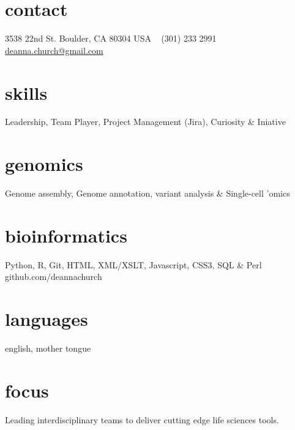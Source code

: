 \documentclass[]{dmc-cv} %
\begin{document}


\begin{aside} %
\section{contact}
3538 22nd St.
Boulder, CA 80304
USA
~
(301) 233 2991
~
\href{mailto:deanna.church@gmail.com}{deanna.church@gmail.com}
\section{skills}
{Leadership, Team Player,
Project Management (Jira),
Curiosity \& Iniative}
\section{genomics}
{Genome assembly,
Genome annotation,
variant analysis \&
Single-cell 'omics}
\section{bioinformatics}
{Python, R, Git,
HTML, XML/XSLT, Javascript,
CSS3, SQL \& Perl
github.com/deannachurch}
\section{languages}
{english, mother tongue}
\end{aside}

\section{focus}
Leading interdisciplinary teams to deliver cutting edge life sciences tools.

\end{document}

